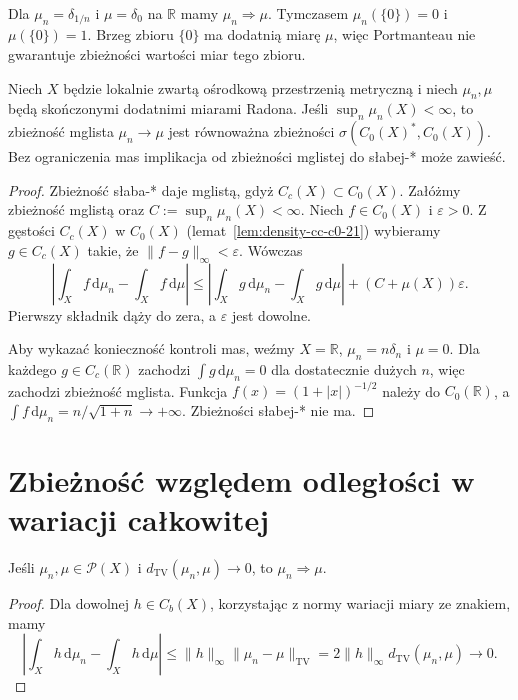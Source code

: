 \begin{przyklad}
Dla $\mu_n=\delta_{1/n}$ i $\mu=\delta_0$ na
$\mathbb R$ mamy $\mu_n\Rightarrow\mu$.
Tymczasem $\mu_n(\{0\})=0$ i $\mu(\{0\})=1$.
Brzeg zbioru $\{0\}$ ma dodatnią miarę $\mu$,
więc Portmanteau nie gwarantuje zbieżności
wartości miar tego zbioru.
\end{przyklad}

\begin{wniosek}
\label{cor:vague-c0-bounded-22}
Niech $X$ będzie lokalnie zwartą ośrodkową przestrzenią
metryczną i niech $\mu_n,\mu$ będą skończonymi dodatnimi
miarami Radona. Jeśli $\sup_n\mu_n(X)<\infty$, to
zbieżność mglista $\mu_n\to\mu$ jest równoważna zbieżności
$\sigma(C_0(X)^*,C_0(X))$.
Bez ograniczenia mas implikacja od zbieżności mglistej
do słabej-* może zawieść.
\end{wniosek}
\begin{proof}
Zbieżność słaba-* daje mglistą, gdyż $C_c(X)\subset C_0(X)$.
Załóżmy zbieżność mglistą oraz $C:=\sup_n\mu_n(X)<\infty$.
Niech $f\in C_0(X)$ i $\varepsilon>0$. Z gęstości
$C_c(X)$ w $C_0(X)$ (lemat~\ref{lem:density-cc-c0-21})
wybieramy $g\in C_c(X)$ takie, że
$\|f-g\|_\infty<\varepsilon$. Wówczas
\[
 \left|\int_X f\,\mathrm d\mu_n-\int_X f\,\mathrm d\mu\right|
 \le\left|\int_Xg\,\mathrm d\mu_n-\int_Xg\,\mathrm d\mu\right|
 +(C+\mu(X))\varepsilon.
\]
Pierwszy składnik dąży do zera, a $\varepsilon$ jest dowolne.

Aby wykazać konieczność kontroli mas, weźmy
$X=\mathbb R$, $\mu_n=n\delta_n$ i $\mu=0$.
Dla każdego $g\in C_c(\mathbb R)$ zachodzi
$\int g\,\mathrm d\mu_n=0$ dla dostatecznie dużych $n$,
więc zachodzi zbieżność mglista. Funkcja
$f(x)=(1+|x|)^{-1/2}$ należy do $C_0(\mathbb R)$,
a $\int f\,\mathrm d\mu_n=n/\sqrt{1+n}\to+\infty$.
Zbieżności słabej-* nie ma.
\end{proof}

\section{Zbieżność względem odległości w wariacji całkowitej}
\begin{twierdzenie}
\label{thm:tv-implies-narrow-22}
Jeśli $\mu_n,\mu\in\mathcal P(X)$ i
$d_{\mathrm{TV}}(\mu_n,\mu)\to0$, to
$\mu_n\Rightarrow\mu$.
\end{twierdzenie}
\begin{proof}
Dla dowolnej $h\in C_b(X)$, korzystając z normy
wariacji miary ze znakiem, mamy
\[
\left|\int_Xh\,\mathrm d\mu_n-\int_Xh\,\mathrm d\mu\right|
\le \|h\|_\infty\|\mu_n-\mu\|_{\mathrm{TV}}
=2\|h\|_\infty d_{\mathrm{TV}}(\mu_n,\mu)\to0.
\]
\end{proof}

